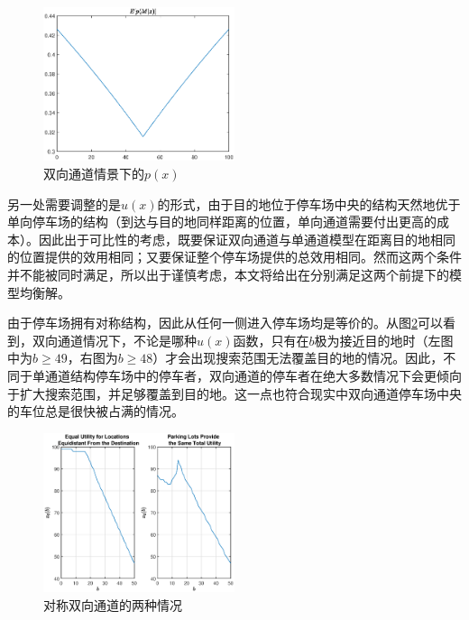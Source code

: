 \documentclass{thuemp}
\begin{document}
\begin{figure}[H]
    \centering
    \includegraphics[width=0.5\textwidth]{double_entrance_p_x.eps}
    \caption{双向通道情景下的$p(x)$}
    \label{fig:5}
\end{figure}



\par 另一处需要调整的是$u(x)$的形式，由于目的地位于停车场中央的结构天然地优于单向停车场的结构（到达与目的地同样距离的位置，单向通道需要付出更高的成本）。因此出于可比性的考虑，既要保证双向通道与单通道模型在距离目的地相同的位置提供的效用相同；又要保证整个停车场提供的总效用相同。然而这两个条件并不能被同时满足，所以出于谨慎考虑，本文将给出在分别满足这两个前提下的模型均衡解。

\par 由于停车场拥有对称结构，因此从任何一侧进入停车场均是等价的。从图\ref{fig:6}可以看到，双向通道情况下，不论是哪种$u(x)$函数，只有在$b$极为接近目的地时（左图中为$b\geq 49$，右图为$b\geq 48$）才会出现搜索范围无法覆盖目的地的情况。因此，不同于单通道结构停车场中的停车者，双向通道的停车者在绝大多数情况下会更倾向于扩大搜索范围，并足够覆盖到目的地。这一点也符合现实中双向通道停车场中央的车位总是很快被占满的情况。

\begin{figure}[H]
    \centering
    \includegraphics[width=0.5\textwidth]{double_entrance.eps}
    \caption{对称双向通道的两种情况}
    \label{fig:6}
\end{figure}
\end{document}
